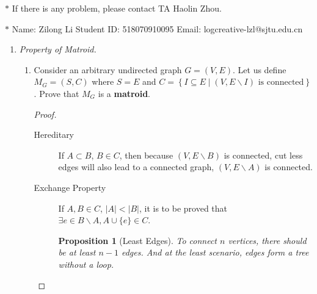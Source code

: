 \documentclass[12pt,a4paper]{article}
\newtheorem{proposition}[theorem]{Proposition}
\theoremstyle{definition}
\begin{document}
\noindent

\noindent{}
\begin{center}
\footnotesize{\color{red}$*$ If there is any problem, please contact TA Haolin Zhou.}

\footnotesize{\color{blue}$*$ Name: Zilong Li  \quad Student ID: 518070910095 \quad Email: logcreative-lzl@sjtu.edu.cn}
\end{center}

\begin{enumerate}
\item \textit{Property of Matroid.} 
\begin{enumerate}
	\item
	Consider an arbitrary undirected graph $ G=(V,E) $. Let us define $ M_{G}=(S,C) $ where $ S=E $ and $ C=\left\{I \subseteq E \mid\left(V, E \backslash I\right) \text { is connected}\right\} $. Prove that $ M_{G} $ is a \textbf{matroid}.\par
	\begin{proof}
		\begin{description}
			\item[Hereditary] If $A\subset B$, $B\in C$, then because $(V,E\backslash B)$ is connected, cut less edges will also lead to a connected graph, $(V,E\backslash A)$ is connected.
			\item[Exchange Property] If $A,B\in C$, $|A|<|B|$, it is to be proved that $\exists e\in B\backslash A, A\cup \{e\}\in C$.
			
			\begin{proposition}[Least Edges]
				To connect $n$ vertices, there should be at least $n-1$ edges. And at the least scenario, edges form a tree without a loop.
			\end{proposition}


\end{description}
\end{proof}
\end{enumerate}
\end{enumerate}
\end{document}

